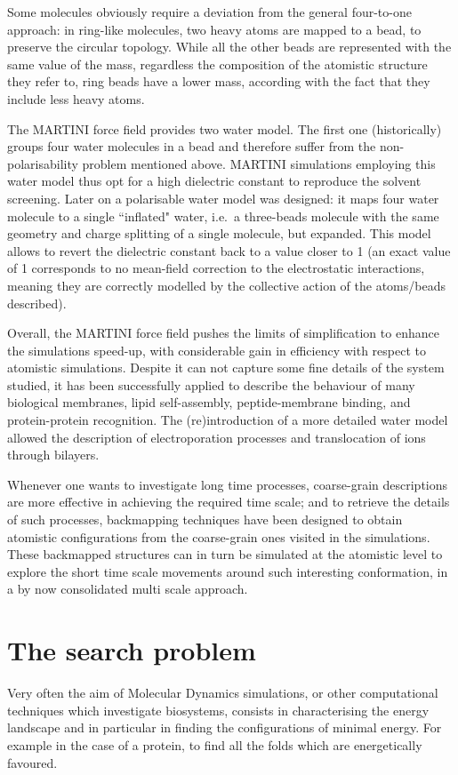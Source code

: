 Some molecules obviously require a deviation from the general four-to-one approach: in ring-like molecules, two heavy atoms are mapped to a bead, to preserve the circular topology. While all the other beads are represented with the same value of the mass, regardless the composition of the atomistic structure they refer to, ring beads have a lower mass, according with the fact that they include less heavy atoms.

The MARTINI force field provides two water model. The first one (historically) groups four water molecules in a bead and therefore suffer from the non-polarisability problem mentioned above. MARTINI simulations employing this water model thus opt for a high dielectric constant to reproduce the solvent screening. Later on a polarisable water model was designed: it maps four water molecule to a single ``inflated" water, i.e.\ a three-beads molecule with the same geometry and charge splitting of a single molecule, but expanded. This model allows to revert the dielectric constant back to a value closer to 1 (an exact value of 1 corresponds to no mean-field correction to the electrostatic interactions, meaning they are correctly modelled by the collective action of the atoms/beads described).

Overall, the MARTINI force field pushes the limits of simplification to enhance the simulations speed-up, with considerable gain in efficiency with respect to atomistic simulations. Despite it can not capture some fine details of the system studied, it has been successfully applied to describe the behaviour of many biological membranes, lipid self-assembly, peptide-membrane binding, and protein-protein recognition. The (re)introduction of a more detailed water model allowed the description of electroporation processes and translocation of ions through bilayers.

Whenever one wants to investigate long time processes, coarse-grain descriptions are more effective in achieving the required time scale; and to retrieve the details of such processes, backmapping techniques have been designed to obtain atomistic configurations from the coarse-grain ones visited in the simulations. These backmapped structures can in turn be simulated at the atomistic level to explore the short time scale movements around such interesting conformation, in a by now consolidated multi scale approach.


  
\section{The search problem} \label{sec:search}
Very often the aim of Molecular Dynamics simulations, or other computational techniques which investigate biosystems, consists in characterising the energy landscape and in particular in finding the configurations of minimal energy. For example in the case of a protein, to find all the folds which are energetically favoured.

